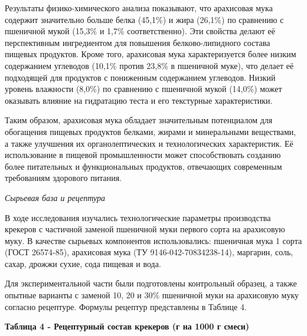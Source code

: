 {{{Результаты физико-химического анализа показывают, что арахисовая мука
содержит значительно больше белка (45,1\%) и жира (26,1\%) по сравнению
с пшеничной мукой (15,3\% и 1,7\% соответственно). Эти свойства делают
её перспективным ингредиентом для повышения белково-липидного состава
пищевых продуктов. Кроме того, арахисовая мука характеризуется более
низким содержанием углеводов (10,1\% против 23,8\% в пшеничной муке),
что делает её подходящей для продуктов с пониженным содержанием
углеводов. Низкий уровень влажности (8,0\%) по сравнению с пшеничной
мукой (14,0\%) может оказывать влияние на гидратацию теста и его
текстурные характеристики.

Таким образом, арахисовая мука обладает значительным потенциалом для
обогащения пищевых продуктов белками, жирами и минеральными веществами,
а также улучшения их органолептических и технологических характеристик.
Её использование в пищевой промышленности может способствовать созданию
более питательных и функциональных продуктов, отвечающих современным
требованиям здорового питания.

\emph{Сырьевая база и рецептура}

В ходе исследования изучались технологические параметры производства
крекеров с частичной заменой пшеничной муки первого сорта на арахисовую
муку. В качестве сырьевых компонентов использовались: пшеничная мука 1
сорта (ГОСТ 26574-85), арахисовая мука (ТУ 9146-042-70834238-14),
маргарин, соль, сахар, дрожжи сухие, сода пищевая и вода.

Для экспериментальной части были подготовлены контрольный образец, а
также опытные варианты с заменой 10, 20 и 30\% пшеничной муки на
арахисовую муку согласно рецептуре. Формулы рецептур представлены в
Таблице 4.

{\bfseries Таблица 4 - Рецептурный состав крекеров (г на 1000 г смеси)}

}}}
